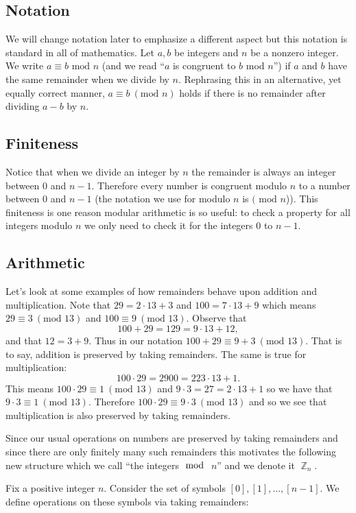 \documentclass[12 pt]{article}
\DeclareMathOperator{\Z}{\mathbb{Z}}
\begin{document}
\subsection{Notation}
We will change notation later to emphasize a different aspect but this notation is standard in all of mathematics. Let $a,b$ be integers and $n$ be a nonzero integer. We write $a\equiv b\text{ mod }n$ (and we read ``$a$ is congruent to $b$ mod $n$'') if $a$ and $b$ have the same remainder when we divide by $n$. Rephrasing this in an alternative, yet equally correct manner, $a \equiv b\ (\text{mod } n)$ holds if there is no remainder after dividing $a - b$ by $n$.

\subsection{Finiteness}
Notice that when we divide an integer by $n$ the remainder is always an integer between 0 and $n-1$. Therefore every number is congruent modulo $n$ to a number between 0 and $n-1$ (the notation we use for modulo $n$ is $(\text{ mod } n$)). This finiteness is one reason modular arithmetic is so useful: to check a property for all integers modulo $n$ we only need to check it for the integers 0 to $n-1$.

\subsection{Arithmetic}
Let's look at some examples of how remainders behave upon addition and multiplication. Note that $29=2\cdot 13+3$ and $100=7 \cdot 13+9$ which means $29\equiv 3\ (\text{mod } 13)$ and $100\equiv 9\ (\text{mod } 13)$. Observe that
\[
100+29=129=9\cdot13+12,
\]
and that $12=3+9$. Thus in our notation $100+29\equiv 9+3\ (\text{mod } 13)$. That is to say, addition is preserved by taking remainders. The same is true for multiplication:
\[
100\cdot29=2900=223\cdot13+1.
\]
This means $100\cdot29\equiv 1\ (\text{mod } 13)$ and $9\cdot 3=27=2\cdot 13+1$ so we have that $9\cdot 3\equiv 1\ (\text{mod } 13)$. Therefore $100\cdot29\equiv 9\cdot3\  (\text{mod } 13)$ and so we see that multiplication is also preserved by taking remainders.

Since our usual operations on numbers are preserved by taking remainders and since there are only finitely many such remainders this motivates the following new structure which we call ``the integers$\mod$ $n$'' and we denote it $\Z_n$.

Fix a positive integer $n$. Consider the set of symbols $[0],[1],...,[n-1]$.  We define operations on these symbols via taking remainders:
\end{document}
